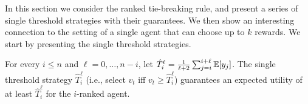 In this section we consider the ranked tie-breaking rule, 
and present a series of single threshold strategies with their guarantees. 
We then show an interesting connection to the setting of a single agent that can choose up to $k$ rewards. 
We start by presenting the single threshold strategies.
 
\begin{theorem}\label{thm:prophet_serial_threshold_inequality}
	For every $i\leq n$ and $\ell=0, \ldots, n-i$, let $\hat{T}_i^\ell=\frac{1}{\ell+2}\sum_{j=i}^{i+\ell} \mathbb{E} [y_j]$. 
	The single threshold strategy $\hat{T}_i^\ell$ (i.e., select $v_t$ iff $v_t\geq \hat{T}_i^\ell$) guarantees an expected utility of at least $\hat{T}_i^\ell$ for the $i$-ranked agent.	
\end{theorem}
